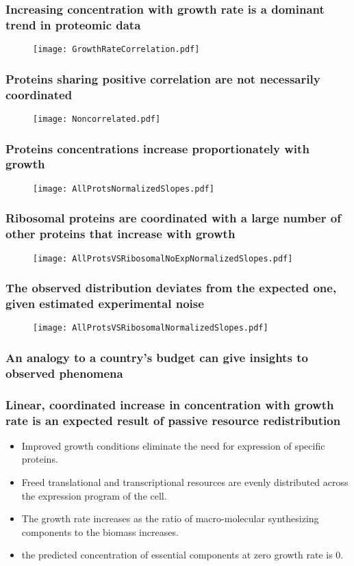 \documentclass{beamer}
\begin{document}
\begin{frame}
\frametitle{Increasing concentration with growth rate is a dominant trend in proteomic data}
\begin{figure}[h!]
\centering
\texttt{[image: GrowthRateCorrelation.pdf]}
\end{figure}
\end{frame}

\begin{frame}
\frametitle{Proteins sharing positive correlation are not necessarily coordinated}
\begin{figure}[h!]
\centering
\texttt{[image: Noncorrelated.pdf]}
\end{figure}
\end{frame}

\begin{frame}
\frametitle{Proteins concentrations increase proportionately with growth}
\begin{figure}[h!]
\centering
\texttt{[image: AllProtsNormalizedSlopes.pdf]}
\end{figure}
\end{frame}

\begin{frame}
\frametitle{Ribosomal proteins are coordinated with a large number of other proteins that increase with growth}
\begin{figure}[h!]
\centering
\texttt{[image: AllProtsVSRibosomalNoExpNormalizedSlopes.pdf]}
\end{figure}
\end{frame}

\begin{frame}
\frametitle{The observed distribution deviates from the expected one, given estimated experimental noise}
\begin{figure}[h!]
\centering
\texttt{[image: AllProtsVSRibosomalNormalizedSlopes.pdf]}
\end{figure}
\end{frame}

\begin{frame}
\frametitle{An analogy to a country's budget can give insights to observed phenomena}
\end{frame}

\begin{frame}
\frametitle{Linear, coordinated increase in concentration with growth rate is an expected result of passive resource redistribution}
\begin{itemize}
\item Improved growth conditions eliminate the need for expression of specific proteins.
\item Freed translational and transcriptional resources are evenly distributed across the expression program of the cell.
\item The growth rate increases as the ratio of macro-molecular synthesizing components to the biomass increases.
\item the predicted concentration of essential components at zero growth rate is 0.
\end{itemize}
\end{frame}
\end{document}
